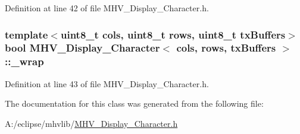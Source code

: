 Definition at line 42 of file M\-H\-V\-\_\-\-Display\-\_\-\-Character.\-h.

\hypertarget{class_m_h_v___display___character_aa227789e26be424c4aead2d27a049f36}{
\subsubsection[{\-\_\-wrap}]{\setlength{\rightskip}{0pt plus 5cm}template$<$uint8\-\_\-t cols, uint8\-\_\-t rows, uint8\-\_\-t tx\-Buffers$>$ bool {\bf M\-H\-V\-\_\-\-Display\-\_\-\-Character}$<$ cols, rows, tx\-Buffers $>$\-::\-\_\-wrap\hspace{0.3cm}{\ttfamily [protected]}}}\label{class_m_h_v___display___character_aa227789e26be424c4aead2d27a049f36}


Definition at line 43 of file M\-H\-V\-\_\-\-Display\-\_\-\-Character.\-h.



The documentation for this class was generated from the following file\-:\begin{DoxyCompactItemize}
\item 
A\-:/eclipse/mhvlib/\hyperlink{_m_h_v___display___character_8h}{M\-H\-V\-\_\-\-Display\-\_\-\-Character.\-h}\end{DoxyCompactItemize}
